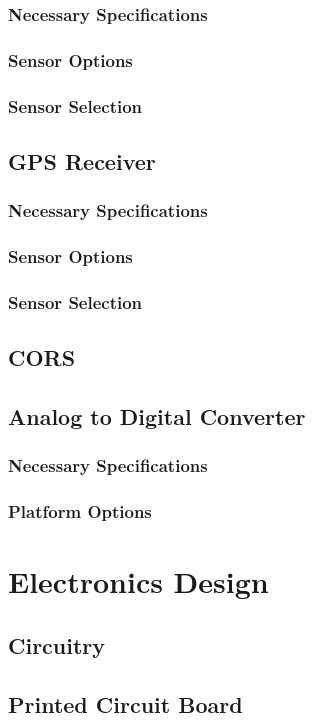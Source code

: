 \documentclass[twoside,11pt]{report}
\begin{document}
			\subsubsection{Necessary Specifications}
			\subsubsection{Sensor Options}
			\subsubsection{Sensor Selection}
		\subsection{GPS Receiver}			
			\subsubsection{Necessary Specifications}
			\subsubsection{Sensor Options}
			\subsubsection{Sensor Selection}
		\subsection{CORS}
		\subsection{Analog to Digital Converter}
			\subsubsection{Necessary Specifications}					
			\subsubsection{Platform Options}
	\section{Electronics Design}
			\subsection{Circuitry}
			\subsection{Printed Circuit Board}
\end{document}
